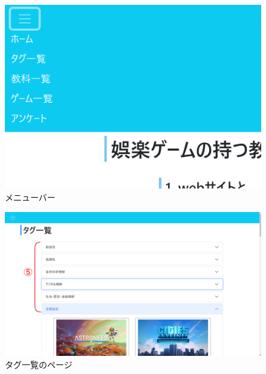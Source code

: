 \documentclass[12pt,a4j,titlepage]{ltjsarticle}
\begin{document}
\begin{figure}[H]
\begin{center}
 \includegraphics[keepaspectratio, scale=0.3]{PDF/menubar.pdf}
\end{center}
 \caption{メニューバー}
 \label{fig:メニューバー}
\end{figure}

\begin{figure}[H]
\begin{center}
 \includegraphics[keepaspectratio, scale=0.15]{PDF/tagpage.pdf}
\end{center}
 \caption{タグ一覧のページ}
 \label{fig:タグページ}
\end{figure}
\end{document}

